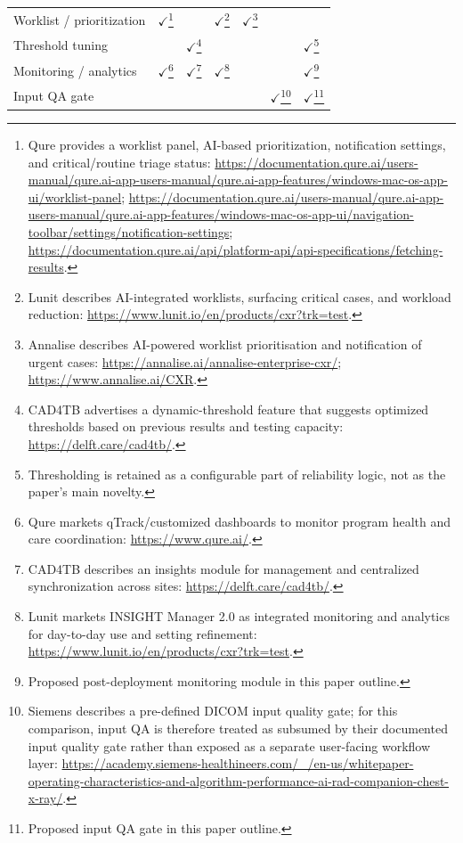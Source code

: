 \documentclass[11pt]{article}
\begin{document}
{\begin{longtable}{p{} p{} p{} p{} p{} p{} p{}}
Worklist / prioritization & $\checkmark$\footnote{Qure provides a worklist panel, AI-based prioritization, notification settings, and critical/routine triage status: \url{https://documentation.qure.ai/users-manual/qure.ai-app-users-manual/qure.ai-app-features/windows-mac-os-app-ui/worklist-panel}; \url{https://documentation.qure.ai/users-manual/qure.ai-app-users-manual/qure.ai-app-features/windows-mac-os-app-ui/navigation-toolbar/settings/notification-settings}; \url{https://documentation.qure.ai/api/platform-api/api-specifications/fetching-results}.} &  & $\checkmark$\footnote{Lunit describes AI-integrated worklists, surfacing critical cases, and workload reduction: \url{https://www.lunit.io/en/products/cxr?trk=test}.} & $\checkmark$\footnote{Annalise describes AI-powered worklist prioritisation and notification of urgent cases: \url{https://annalise.ai/annalise-enterprise-cxr/}; \url{https://www.annalise.ai/CXR}.} &  &  \\

Threshold tuning &  & $\checkmark$\footnote{CAD4TB advertises a dynamic-threshold feature that suggests optimized thresholds based on previous results and testing capacity: \url{https://delft.care/cad4tb/}.} &  &  &  & $\checkmark$\footnote{Thresholding is retained as a configurable part of reliability logic, not as the paper's main novelty.} \\

Monitoring / analytics & $\checkmark$\footnote{Qure markets qTrack/customized dashboards to monitor program health and care coordination: \url{https://www.qure.ai/}.} & $\checkmark$\footnote{CAD4TB describes an insights module for management and centralized synchronization across sites: \url{https://delft.care/cad4tb/}.} & $\checkmark$\footnote{Lunit markets INSIGHT Manager 2.0 as integrated monitoring and analytics for day-to-day use and setting refinement: \url{https://www.lunit.io/en/products/cxr?trk=test}.} &  &  & $\checkmark$\footnote{Proposed post-deployment monitoring module in this paper outline.} \\

Input QA gate &  &  &  &  & $\checkmark$\footnote{Siemens describes a pre-defined DICOM input quality gate; for this comparison, input QA is therefore treated as subsumed by their documented input quality gate rather than exposed as a separate user-facing workflow layer: \url{https://academy.siemens-healthineers.com/_/en-us/whitepaper-operating-characteristics-and-algorithm-performance-ai-rad-companion-chest-x-ray/}.} & $\checkmark$\footnote{Proposed input QA gate in this paper outline.} \\


\end{longtable}}
\end{document}
